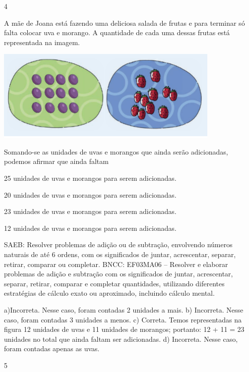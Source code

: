 \begin{multicols}{2}
{\begin{escolha}
{\num{4}

A mãe de Joana está fazendo uma deliciosa salada de frutas e para terminar só falta colocar uva e morango. A quantidade de cada uma dessas frutas está representada na imagem.


\includegraphics[width=4.26704in,height=1.75849in]{media/image132.png}

Somando-se as unidades de uvas e morangos que ainda serão adicionadas, podemos afirmar que ainda faltam

\begin{escolha}

\item
  25 unidades de uvas e morangos para serem adicionadas.
\item
  20 unidades de uvas e morangos para serem adicionadas.
\item
  23 unidades de uvas e morangos para serem adicionadas.
\item
  12 unidades de uvas e morangos para serem adicionadas.
\end{escolha}

SAEB: Resolver problemas de adição ou de subtração,
envolvendo números naturais de até 6 ordens, com os significados de
juntar, acrescentar, separar, retirar, comparar ou completar.
BNCC: EF03MA06 – Resolver e elaborar problemas de adição e subtração com os significados de
juntar, acrescentar, separar, retirar, comparar e completar quantidades, utilizando diferentes
estratégias de cálculo exato ou aproximado, incluindo cálculo mental.

a)Incorreta. Nesse caso, foram contadas 2 unidades a mais.
b) Incorreta. Nesse caso, foram contadas 3 unidades a menos.
c) Correta. Temos representadas na figura 12 unidades de uvas e 11 unidades de morangos; portanto: 12 + 11 = 23 unidades no total que ainda faltam ser adicionadas.
d) Incorreta. Nesse caso, foram contadas apenas as uvas.

\num{5}

}
\end{escolha}}
\end{multicols}
